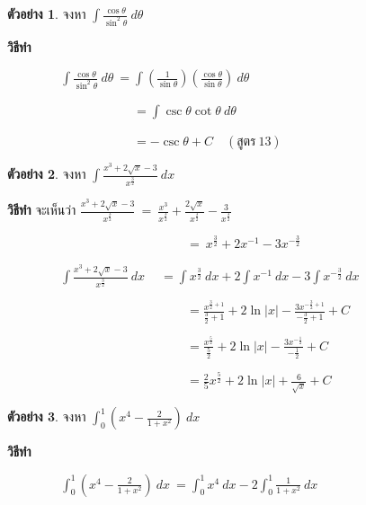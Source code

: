\documentclass[
]{book}
\theoremstyle{definition}
\theoremstyle{definition}
\newtheorem{example}{ตัวอย่าง}[chapter]
\theoremstyle{definition}
\theoremstyle{definition}
\theoremstyle{remark}
\begin{document}
\begin{example}
จงหา \(\displaystyle \int \frac{\cos \theta}{\sin^{2} \theta}
\ d\theta\)
\end{example}

\textbf{วิธีทำ}

\(\qquad \qquad \ \displaystyle \int \frac{\cos \theta}{\sin^{2} \theta} \ 
d\theta \ = \int \left(\frac{1}{\sin \theta}\right) \left(\frac{\cos
\theta}{\sin \theta}\right) \ d\theta\)

\(\qquad \qquad \qquad \qquad \qquad = \displaystyle \int \csc \theta \cot
\theta \ d\theta\)

\(\qquad \qquad \qquad \qquad \qquad = \displaystyle -\csc \theta +C \quad (
\mbox{สูตร} \ 13)\)

\begin{example}
จงหา \(\displaystyle \int
\frac{x^{3}+2\sqrt{x}-3}{x^{\frac{3}{2}}} \ dx\)
\end{example}

\textbf{วิธีทำ} จะเห็นว่า \(\displaystyle
\frac{x^{3}+2\sqrt{x}-3}{x^{\frac{3}{2}}} \ = \ 
\frac{x^{3}}{x^{\frac{3}{2}}}+\frac{2\sqrt{x}}{x^{\frac{3}{2}}}-\frac{3}{x^{\frac{3}{2}}}\)

\(\qquad \qquad \qquad \qquad \qquad \qquad \qquad \ = \ 
x^{\frac{3}{2}}+2x^{-1}-3x^{-\frac{3}{2}}\)

\(\qquad \qquad\ \displaystyle \int \frac{x^{3}+2\sqrt{x}-3}{x^{\frac{3}{2}}}
\ dx \quad \ = \int x^{\frac{3}{2}} \ dx +2 \int x^{-1} \ dx -3 \int
x^{-\frac{3}{2}} \ dx\)

\(\qquad \qquad \qquad \qquad \qquad \qquad \qquad \ =\displaystyle
\frac{x^{\frac{3}{2}+1}}{\frac{3}{2}+1}  + 2 \ln |x|
-\frac{3x^{-\frac{3}{2}+1}}{-\frac{3}{2}+1} + C\)

\(\qquad \qquad \qquad \qquad \qquad \qquad \qquad \ =\displaystyle
\frac{x^{\frac{5}{2}}}{\frac{5}{2}} + 2 \ln
|x|-\frac{3x^{-\frac{1}{2}}}{-\frac{1}{2}}+ C\)

\(\qquad \qquad \qquad \qquad \qquad \qquad \qquad \ =\displaystyle
\frac{2}{5}x^{\frac{5}{2}}+ 2 \ln |x|+\frac{6}{\sqrt{x}}+ C\)

\begin{example}
จงหา \(\displaystyle \int_{0}^{1} \left( x^{4} -
\frac{2}{1+x^{2}} \right) \ dx\)
\end{example}

\textbf{วิธีทำ}

\(\qquad \qquad\ \displaystyle \int_{0}^{1} \left( x^{4} - \frac{2}{1+x^{2}}
\right) \ dx \ = \int_{0}^{1} x^{4} \ dx - 2 \int_{0}^{1} \frac{1}{1+x^{2}}
\ dx\)
\end{document}
